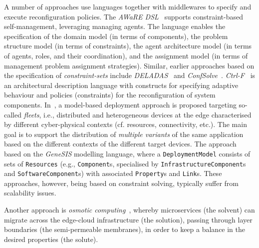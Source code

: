 \documentclass[conference]{IEEEtran}
\begin{document}
A number of approaches use languages together with middlewares to specify and execute reconfiguration policies.
%
%
%
The \emph{AWaRE DSL}~\cite{DBLP:conf/aswec/ChhetriLUVKNR18/adsl} supports constraint-based self-management,
leveraging managing agents.
The language enables the specification of the domain model (in terms of components),
the problem structure model (in terms of constraints),
the agent architecture model (in terms of agents, roles, and their coordination), and the assignment model (in terms of management problem assignment strategies).
%
Similar, earlier approaches based on the specification of \emph{constraint-sets} include \emph{DELADAS}~\cite{Dearle2004deladas}
and \emph{ConfSolve}~\cite{DBLP:conf/saso/HewsonAG13}.
%
\emph{Ctrl-F}~\cite{DBLP:journals/jss/AlvaresRS17}
 is an architectural description language
 with constructs for specifying adaptive behaviour 
 and policies (constraints) for the reconfiguration of system components.
%
%
In~\cite{DBLP:journals/sosym/SongDFSF22},
  a model-based deployment approach is proposed
  targeting so-called \emph{fleets}, i.e.,
  distributed and heterogeneous devices at the edge characterised by different cyber-physical contexts
(cf. resources, connectivity, etc.).
%
The main goal is to support the distribution of \emph{multiple variants} of the same application based on the different contexts of the different target devices.
%
The approach based on the \emph{GeneSIS} modelling language,
where a \texttt{DeploymentModel} consists of sets of \texttt{Resources} (e.g., \texttt{Component}s, specialised by \texttt{InfrastructureComponent}s and \texttt{SoftwareComponent}s) with associated \texttt{Property}s and \texttt{Link}s.
%
These approaches, however, being based on constraint solving, typically suffer from scalability issues.

Another approach is \emph{osmotic computing}~\cite{DBLP:journals/computer/VillariFDRJR19},
 whereby microservices (the solvent)
 can migrate across 
 the edge-cloud infrastructure (the solution),
 passing through layer boundaries (the semi-permeable membranes),
 in order to keep a balance in the desired properties (the solute).
%
\end{document}
